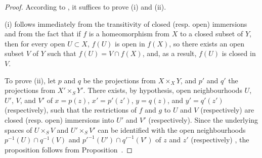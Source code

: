 \begin{proof}
According to , it suffices to prove (i) and (ii).

(i) follows immediately from the transitivity of closed (resp. open) immersions  and from the fact that if $f$ is a homeomorphism from $X$ to a closed subset of $Y$, then for every open $U\subset X$, $f(U)$ is open in $f(X)$, so there exists an open subset $V$ of $Y$ such that $f(U)=V\cap f(X)$, and, as a result, $f(U)$ is closed in $V$.

To prove (ii), let $p$ and $q$ be the projections from $X\times_X Y$, and $p'$ and $q'$ the projections from $X'\times_S Y'$.
There exists, by hypothesis, open neighbourhoods $U$, $U'$, $V$, and $V'$ of $x=p(z)$, $x'=p'(z')$, $y=q(z)$, and $y'=q'(z')$ (respectively), such that the restrictions of $f$ and $g$ to $U$ and $V$ (respectively) are closed (resp. open) immersions into $U'$ and $V'$ (respectively).
Since the underlying spaces of $U\times_S V$ and $U'\times_S V'$ can be identified with the open neighbourhoods $p^{-1}(U)\cap q^{-1}(V)$ and ${p'}^{-1}(U')\cap{q'}^{-1}(V')$ of $z$ and $z'$ (respectively) , the proposition follows from Proposition~.
\end{proof}

